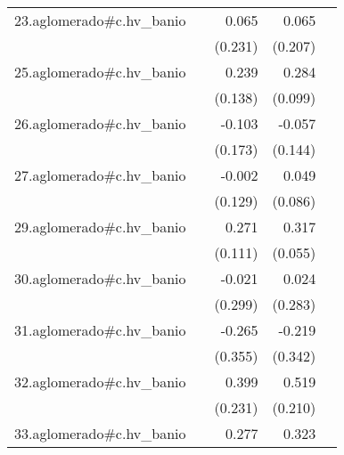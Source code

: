 {\begin{longtable}{l*{4}{D{.}{.}{-1}}}
\addlinespace
23.aglomerado#c.hv\_banio&                     &       0.065         &       0.065         &                     \\
            &                     &     (0.231)         &     (0.207)         &                     \\
\addlinespace
25.aglomerado#c.hv\_banio&                     &       0.239         &       0.284\sym{**} &                     \\
            &                     &     (0.138)         &     (0.099)         &                     \\
\addlinespace
26.aglomerado#c.hv\_banio&                     &      -0.103         &      -0.057         &                     \\
            &                     &     (0.173)         &     (0.144)         &                     \\
\addlinespace
27.aglomerado#c.hv\_banio&                     &      -0.002         &       0.049         &                     \\
            &                     &     (0.129)         &     (0.086)         &                     \\
\addlinespace
29.aglomerado#c.hv\_banio&                     &       0.271\sym{*}  &       0.317\sym{***}&                     \\
            &                     &     (0.111)         &     (0.055)         &                     \\
\addlinespace
30.aglomerado#c.hv\_banio&                     &      -0.021         &       0.024         &                     \\
            &                     &     (0.299)         &     (0.283)         &                     \\
\addlinespace
31.aglomerado#c.hv\_banio&                     &      -0.265         &      -0.219         &                     \\
            &                     &     (0.355)         &     (0.342)         &                     \\
\addlinespace
32.aglomerado#c.hv\_banio&                     &       0.399         &       0.519\sym{*}  &                     \\
            &                     &     (0.231)         &     (0.210)         &                     \\
\addlinespace
33.aglomerado#c.hv\_banio&                     &       0.277\sym{**} &       0.323\sym{***}&                     \\

\end{longtable}}
